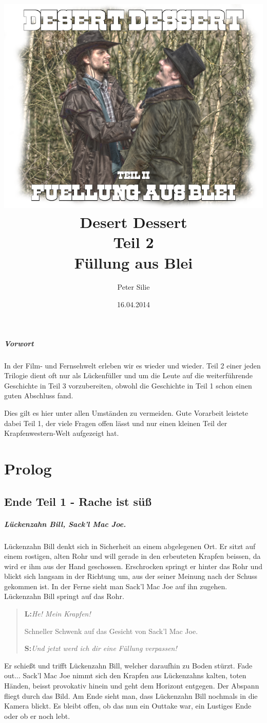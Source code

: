 \documentclass[12pt,a4paper,german]{book}
\author{Peter Silie}
\title{	\includegraphics[scale=0.5]{titelbild.png}\\
		\vspace{1cm}
		Desert Dessert\\
		Teil 2\\
		Füllung aus Blei
		}
\date{16.04.2014}
\begin{document}
\maketitle
\setcounter{tocdepth}{4}
\tableofcontents
\newpage
\paragraph{Vorwort}
In der Film- und Fernsehwelt erleben wir es wieder und wieder. Teil 2 einer jeden Trilogie dient oft nur als Lückenfüller und um die Leute auf die weiterführende Geschichte in Teil 3 vorzubereiten, obwohl die Geschichte in Teil 1 schon einen guten Abschluss fand.

Dies gilt es hier unter allen Umständen zu vermeiden. Gute Vorarbeit leistete dabei Teil 1, der viele Fragen offen lässt und nur einen kleinen Teil der Krapfenwestern-Welt aufgezeigt hat.
\chapter{Prolog}
\section{Ende Teil 1 - Rache ist süß}
\paragraph{\emph{L}ückenzahn Bill, \emph{S}ack'l Mac Joe.\\}
Lückenzahn Bill denkt sich in Sicherheit an einem abgelegenen Ort. Er sitzt auf einem rostigen, alten Rohr und will gerade in den erbeuteten Krapfen beissen, da wird er ihm aus der Hand geschossen. Erschrocken springt er hinter das Rohr und blickt sich langsam in der Richtung um, aus der seiner Meinung nach der Schuss gekommen ist. In der Ferne sieht man Sack'l Mac Joe auf ihn zugehen. Lückenzahn Bill springt auf das Rohr.

\begin{verse}
\textbf{L:}\textit{\glqq He! Mein Krapfen!\grqq}

Schneller Schwenk auf das Gesicht von Sack'l Mac Joe.

\textbf{S:}\textit{\glqq Und jetzt werd ich dir eine Füllung verpassen!\grqq}
\end{verse}

Er schießt und trifft Lückenzahn Bill, welcher daraufhin zu Boden stürzt. Fade out...
Sack'l Mac Joe nimmt sich den Krapfen aus Lückenzahns kalten, toten Händen, beisst provokativ hinein und geht dem Horizont entgegen.
Der Abspann fliegt durch das Bild.
Am Ende sieht man, dass Lückenzahn Bill nochmals in die Kamera blickt. Es bleibt offen, ob das nun ein Outtake war, ein Lustiges Ende oder ob er noch lebt.
\end{document}
